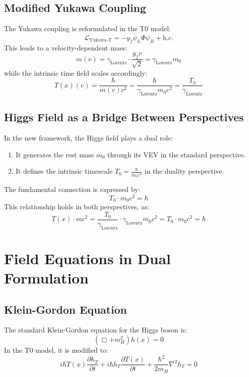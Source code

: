 \documentclass[a4paper,12pt]{article}
\newcommand{\Tfield}{T(x)}
\newcommand{\Tzero}{T_0}
\newcommand{\gammaf}{\gamma_{\text{Lorentz}}}
\begin{document}
	\subsection{Modified Yukawa Coupling}
	The Yukawa coupling is reformulated in the T0 model:
	\begin{equation}
		\mathcal{L}_{\text{Yukawa-T}} = -y_f \bar{\psi}_L \Phi \psi_R + \text{h.c.}
	\end{equation}
	This leads to a velocity-dependent mass:
	\begin{equation}
		m(v) = \gammaf \cdot \frac{y_f v}{\sqrt{2}} = \gammaf m_0
	\end{equation}
	while the intrinsic time field scales accordingly:
	\begin{equation}
		\Tfield(v) = \frac{\hbar}{m(v)c^2} = \frac{\hbar}{\gammaf m_0 c^2} = \frac{\Tzero}{\gammaf}
	\end{equation}
	
	\subsection{Higgs Field as a Bridge Between Perspectives}
	In the new framework, the Higgs field plays a dual role:
	\begin{enumerate}
		\item It generates the rest mass \( m_0 \) through its VEV in the standard perspective.
		\item It defines the intrinsic timescale \( \Tzero = \frac{\hbar}{m_0 c^2} \) in the duality perspective.
	\end{enumerate}
	The fundamental connection is expressed by:
	\begin{equation}
		\Tzero \cdot m_0 c^2 = \hbar
	\end{equation}
	This relationship holds in both perspectives, as:
	\begin{equation}
		\Tfield \cdot m c^2 = \frac{\Tzero}{\gammaf} \cdot \gammaf m_0 c^2 = \Tzero \cdot m_0 c^2 = \hbar
	\end{equation}
	
	\section{Field Equations in Dual Formulation}
	\subsection{Klein-Gordon Equation}
	The standard Klein-Gordon equation for the Higgs boson is:
	\begin{equation}
		(\Box + m_H^2) h(x) = 0
	\end{equation}
	In the T0 model, it is modified to:
	\begin{equation}
		i\hbar \Tfield \frac{\partial h_T}{\partial t} + i\hbar h_T \frac{\partial \Tfield}{\partial t} + \frac{\hbar^2}{2 m_H} \nabla^2 h_T = 0
	\end{equation}
	
\end{document}
